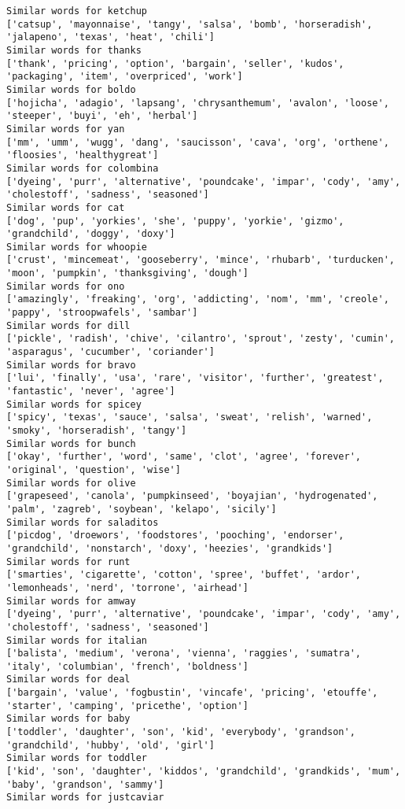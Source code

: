 \documentclass[11pt]{article}
\begin{document}
\begin{Verbatim}[commandchars=\\\{\}]
Similar words for ketchup
['catsup', 'mayonnaise', 'tangy', 'salsa', 'bomb', 'horseradish', 'jalapeno', 'texas', 'heat', 'chili']
Similar words for thanks
['thank', 'pricing', 'option', 'bargain', 'seller', 'kudos', 'packaging', 'item', 'overpriced', 'work']
Similar words for boldo
['hojicha', 'adagio', 'lapsang', 'chrysanthemum', 'avalon', 'loose', 'steeper', 'buyi', 'eh', 'herbal']
Similar words for yan
['mm', 'umm', 'wugg', 'dang', 'saucisson', 'cava', 'org', 'orthene', 'floosies', 'healthygreat']
Similar words for colombina
['dyeing', 'purr', 'alternative', 'poundcake', 'impar', 'cody', 'amy', 'cholestoff', 'sadness', 'seasoned']
Similar words for cat
['dog', 'pup', 'yorkies', 'she', 'puppy', 'yorkie', 'gizmo', 'grandchild', 'doggy', 'doxy']
Similar words for whoopie
['crust', 'mincemeat', 'gooseberry', 'mince', 'rhubarb', 'turducken', 'moon', 'pumpkin', 'thanksgiving', 'dough']
Similar words for ono
['amazingly', 'freaking', 'org', 'addicting', 'nom', 'mm', 'creole', 'pappy', 'stroopwafels', 'sambar']
Similar words for dill
['pickle', 'radish', 'chive', 'cilantro', 'sprout', 'zesty', 'cumin', 'asparagus', 'cucumber', 'coriander']
Similar words for bravo
['lui', 'finally', 'usa', 'rare', 'visitor', 'further', 'greatest', 'fantastic', 'never', 'agree']
Similar words for spicey
['spicy', 'texas', 'sauce', 'salsa', 'sweat', 'relish', 'warned', 'smoky', 'horseradish', 'tangy']
Similar words for bunch
['okay', 'further', 'word', 'same', 'clot', 'agree', 'forever', 'original', 'question', 'wise']
Similar words for olive
['grapeseed', 'canola', 'pumpkinseed', 'boyajian', 'hydrogenated', 'palm', 'zagreb', 'soybean', 'kelapo', 'sicily']
Similar words for saladitos
['picdog', 'droewors', 'foodstores', 'pooching', 'endorser', 'grandchild', 'nonstarch', 'doxy', 'heezies', 'grandkids']
Similar words for runt
['smarties', 'cigarette', 'cotton', 'spree', 'buffet', 'ardor', 'lemonheads', 'nerd', 'torrone', 'airhead']
Similar words for amway
['dyeing', 'purr', 'alternative', 'poundcake', 'impar', 'cody', 'amy', 'cholestoff', 'sadness', 'seasoned']
Similar words for italian
['balista', 'medium', 'verona', 'vienna', 'raggies', 'sumatra', 'italy', 'columbian', 'french', 'boldness']
Similar words for deal
['bargain', 'value', 'fogbustin', 'vincafe', 'pricing', 'etouffe', 'starter', 'camping', 'pricethe', 'option']
Similar words for baby
['toddler', 'daughter', 'son', 'kid', 'everybody', 'grandson', 'grandchild', 'hubby', 'old', 'girl']
Similar words for toddler
['kid', 'son', 'daughter', 'kiddos', 'grandchild', 'grandkids', 'mum', 'baby', 'grandson', 'sammy']
Similar words for justcaviar

\end{Verbatim}
\end{document}

